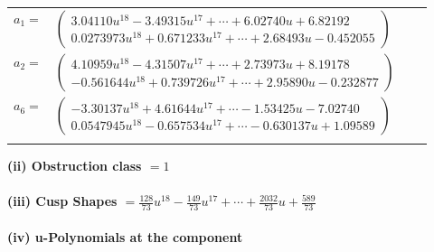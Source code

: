 \documentclass[1p]{elsarticle_modified}
\theoremstyle{definition}
\begin{document}
\begin{tabular}{m{7pt} m{180pt} m{7pt} m{180pt} }
\flushright $a_{1}=$&$\begin{pmatrix}3.04110 u^{18}-3.49315 u^{17}+\cdots+6.02740 u+6.82192\\0.0273973 u^{18}+0.671233 u^{17}+\cdots+2.68493 u-0.452055\end{pmatrix}$ \\
\flushright $a_{2}=$&$\begin{pmatrix}4.10959 u^{18}-4.31507 u^{17}+\cdots+2.73973 u+8.19178\\-0.561644 u^{18}+0.739726 u^{17}+\cdots+2.95890 u-0.232877\end{pmatrix}$ \\
\flushright $a_{6}=$&$\begin{pmatrix}-3.30137 u^{18}+4.61644 u^{17}+\cdots-1.53425 u-7.02740\\0.0547945 u^{18}-0.657534 u^{17}+\cdots-0.630137 u+1.09589\end{pmatrix}$\\&\end{tabular}
\flushleft \textbf{(ii) Obstruction class $= 1$}\\~\\
\flushleft \textbf{(iii) Cusp Shapes $= \frac{128}{73} u^{18}-\frac{149}{73} u^{17}+\cdots+\frac{2032}{73} u+\frac{589}{73}$}\\~\\
\newpage\renewcommand{\arraystretch}{1}
\flushleft \textbf{(iv) u-Polynomials at the component}\newline \\
\end{document}
